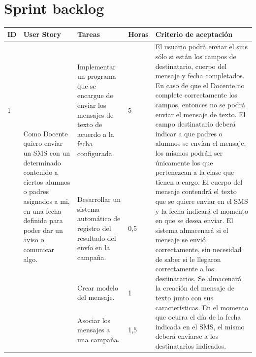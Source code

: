 \documentclass[a4paper, 11pt]{article}
\begin{document}
\section{Sprint backlog}
\begin{table}[H]
\centering
\begin{tabular}{ | p{0.5cm} | p{4cm} | p{5cm} | p{0.85cm} | p{5cm} | }
\hline
ID & User Story & Tareas & Horas & Criterio de aceptación \\
\hline \hline

1 & \multirow{4}{4cm}{Como Docente quiero enviar un SMS con un determinado contenido a ciertos alumnos o padres asignados a mi, en una fecha definida para poder dar un aviso o comunicar algo.} & Implementar un programa que se encargue de enviar los mensajes de texto de acuerdo a la fecha configurada. & 5 & \multirow{4}{5cm}{El usuario podrá enviar el sms sólo si están los  campos de destinatario, cuerpo del mensaje y fecha completados. En caso de que el Docente no complete correctamente los campos, entonces no se podrá enviar el mensaje de texto. El campo destinatario deberá indicar a que padres o alumnos se envían el mensaje, los mismos podrán ser únicamente los que pertenezcan a la clase que tienen a cargo. El cuerpo del mensaje contendrá el texto que se quiere enviar en el SMS y la fecha indicará el momento en que se desea enviar. El sistema almacenará si el mensaje se envió correctamente, sin necesidad de saber si le llegaron correctamente a los destinatarios.
Se almacenará la creación del mensaje de texto junto con sus características. 
En el momento que ocurra el día de la fecha indicada en el SMS, el mismo deberá enviarse a los destinatarios indicados. } \\[3.5cm] \cline{3-4} 
& & Desarrollar un sistema automático de registro del resultado del envío en la campaña. & 0,5 & \\[3.5cm] \cline{3-4} 
& & Crear modelo del mensaje. & 1 & \\[3.5cm] \cline{3-4} 
& & Asociar los mensajes a una campaña. & 1,5 & \\[3.5cm] \hline

\end{tabular}
\end{table}
\end{document}

